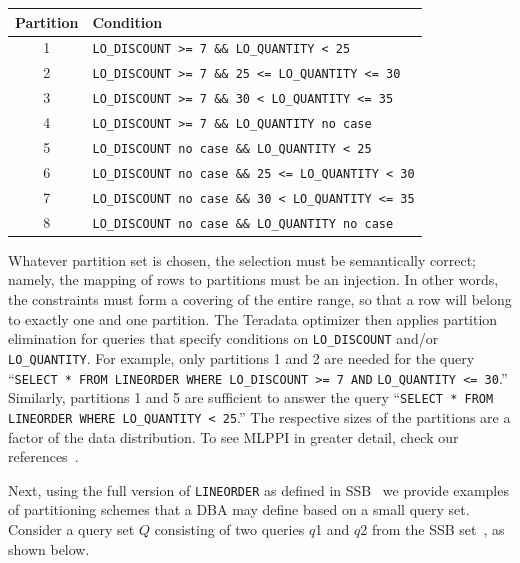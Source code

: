 \documentclass[paper]{ieice}
\begin{document}
\begin{center}
\begin{tabular}{|c|p{6cm}|}\hline 
Partition & Condition \\ \hline
1		& {\scriptsize  {\tt LO\_DISCOUNT >= 7 \&\& LO\_QUANTITY < 25}} \\ \hline
2		& {\scriptsize  {\tt LO\_DISCOUNT >= 7 \&\& 25 <= LO\_QUANTITY <= 30}} \\ \hline
3		& {\scriptsize {\tt LO\_DISCOUNT >= 7 \&\& 30 < LO\_QUANTITY <= 35}} \\ \hline
4		& {\scriptsize {\tt LO\_DISCOUNT >= 7 \&\& LO\_QUANTITY no case}}\\ \hline
5       & {\scriptsize {\tt LO\_DISCOUNT no case \&\& LO\_QUANTITY < 25}} \\ \hline 
6		& {\scriptsize {\tt LO\_DISCOUNT no case \&\& 25 <= LO\_QUANTITY < 30}} \\\hline								  	        
7		& {\scriptsize {\tt LO\_DISCOUNT no case \&\& 30 < LO\_QUANTITY <= 35}} \\ \hline
8		& {\scriptsize  {\tt LO\_DISCOUNT no case \&\& LO\_QUANTITY no case}} \\ \hline
\end{tabular}
\end{center}

Whatever partition set is chosen, 
the selection must be semantically correct; namely, 
the mapping of rows to partitions must be an injection. 
In other words, the constraints must form a covering of 
the entire range, so that a row will belong to exactly one and one partition. 
The Teradata optimizer then applies \hbox{partition} elimination for queries 
that specify conditions on {\tt LO\_DISCOUNT} and/or {\tt LO\_QUANTITY}. 
For \hbox{example}, only partitions 1 and 2 are needed for the query 
``{\tt SELECT * FROM LINEORDER WHERE LO\_DISCOUNT >= 7 AND} {\tt LO\_QUANTITY <= 30}.'' 
Similarly, partitions 1 and 5 are sufficient to answer the query 
``{\tt SELECT * FROM LINEORDER WHERE LO\_QUANTITY < 25}.'' 
The respective sizes of the partitions are a factor of the data distribution. 
To see MLPPI in greater detail, check our references~\cite{sinclair:ppi,klindt09mlppi}. 

Next, using the full version of {\tt LINEORDER} as defined in SSB~\cite{oneil:ssb} 
we provide examples of partitioning schemes that 
a DBA may define based on a small query set. 
Consider a query set $Q$ consisting of two queries $q$1 and $q$2 from the SSB set~\cite{oneil:ssb}, as shown below.
\end{document}
